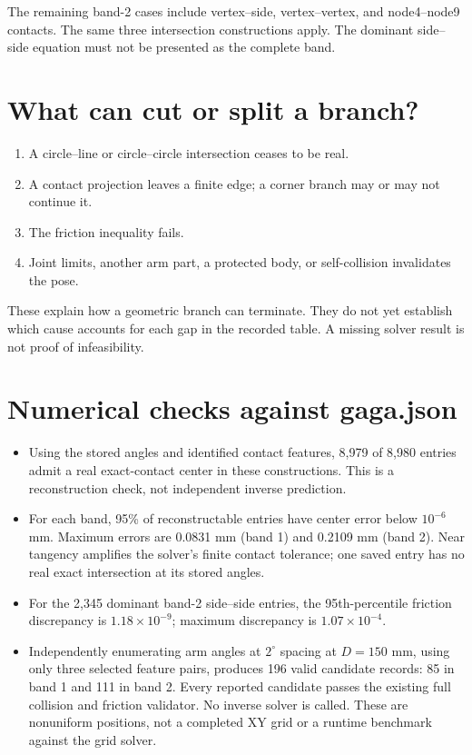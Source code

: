 \documentclass{article}
\begin{document}
The remaining band-2 cases include vertex--side, vertex--vertex, and node4--node9 contacts. The same three intersection constructions apply. The dominant side--side equation must not be presented as the complete band.

\section{What can cut or split a branch?}
\begin{enumerate}
\item A circle--line or circle--circle intersection ceases to be real.
\item A contact projection leaves a finite edge; a corner branch may or may not continue it.
\item The friction inequality fails.
\item Joint limits, another arm part, a protected body, or self-collision invalidates the pose.
\end{enumerate}
These explain how a geometric branch can terminate. They do not yet establish which cause accounts for each gap in the recorded table. A missing solver result is not proof of infeasibility.

\section{Numerical checks against gaga.json}
\begin{itemize}
\item Using the stored angles and identified contact features, 8,979 of 8,980 entries admit a real exact-contact center in these constructions. This is a reconstruction check, not independent inverse prediction.
\item For each band, 95\% of reconstructable entries have center error below $10^{-6}$ mm. Maximum errors are 0.0831 mm (band 1) and 0.2109 mm (band 2). Near tangency amplifies the solver's finite contact tolerance; one saved entry has no real exact intersection at its stored angles.
\item For the 2,345 dominant band-2 side--side entries, the 95th-percentile friction discrepancy is $1.18\times10^{-9}$; maximum discrepancy is $1.07\times10^{-4}$.
\item Independently enumerating arm angles at $2^\circ$ spacing at $D=150$ mm, using only three selected feature pairs, produces 196 valid candidate records: 85 in band 1 and 111 in band 2. Every reported candidate passes the existing full collision and friction validator. No inverse solver is called. These are nonuniform positions, not a completed XY grid or a runtime benchmark against the grid solver.
\end{itemize}
\end{document}
